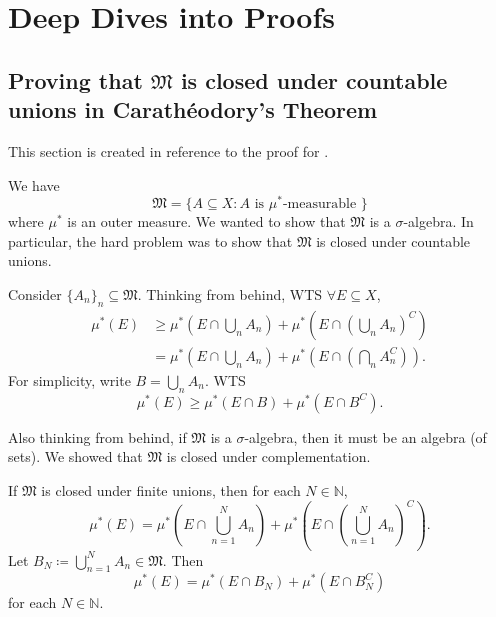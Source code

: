 \documentclass[notoc,notitlepage]{tufte-book}
\begin{document}

\appendix

\chapter{Deep Dives into Proofs}%
\label{chp:deep_dives_into_proofs}

\section{Proving that \texorpdfstring{$\mathfrak{M}$}{M} is closed under countable unions in Carath\'{e}odory's Theorem}\label{sec:proving_that_m_is_closed_under_countable_unions_in_caratheodory_s_theorem}

This section is created in reference to
the proof for .

We have
\begin{equation*}
  \mathfrak{M} = \{ A \subseteq X : A \text{ is } \mu^*\text{-measurable } \}
\end{equation*}
where $\mu^*$ is an outer measure.
We wanted to show that $\mathfrak{M}$ is a $\sigma$-algebra.
In particular, the hard problem was to show that
$\mathfrak{M}$ is closed under countable unions.

Consider $\{ A_n \}_{n} \subseteq \mathfrak{M}$.
Thinking from behind, WTS $\forall E \subseteq X$,
\begin{align*}
  \mu^*(E)
  &\geq \mu^* \left( E \cap \bigcup_{n} A_n \right)
    + \mu^* \left( E \cap \left( \bigcup_{n} A_n \right)^C \right) \\
  &= \mu^* \left( E \cap \bigcup_{n} A_n \right)
    + \mu^* \left( E \cap \left( \bigcap_{n} A_n^C \right) \right).
\end{align*}
For simplicity, write $B = \bigcup_{n} A_n$.
WTS
\begin{equation}\tag{$*$}\label{eq:appendix_1_eq_1}
  \mu^*(E) \geq \mu^*(E \cap B) + \mu^*(E \cap B^C).
\end{equation}

Also thinking from behind,
if $\mathfrak{M}$ is a $\sigma$-algebra, 
then it must be an algebra (of sets).
We showed that $\mathfrak{M}$ is closed under complementation.

If $\mathfrak{M}$ is closed under finite unions,
then for each $N \in \mathbb{N}$,
\begin{equation*}
  \mu^*(E) = \mu^* \left( E \cap \bigcup_{n=1}^{N} A_n \right)
    + \mu^* \left( E \cap \left( \bigcup_{n=1}^{N} A_n \right)^C \right).
\end{equation*}
Let $B_N \coloneqq \bigcup_{n=1}^{N} A_n \in \mathfrak{M}$. Then
\begin{equation}\tag{$\dagger$}\label{eq:appendix_1_eq_2}
  \mu^*(E) = \mu^* (E \cap B_N) + \mu^* (E \cap B_N^C)
\end{equation}
for each $N \in \mathbb{N}$.
\end{document}
